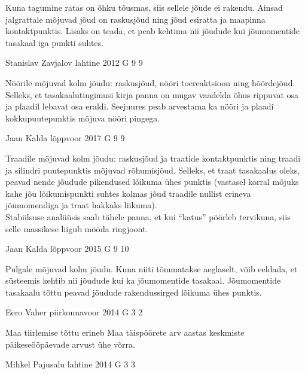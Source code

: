 \documentclass[11pt]{article}
\begin{document}
{{\ifHint
Kuna tagumine ratas on õhku tõusmas, siis sellele jõude ei rakendu. Ainsad jalgrattale mõjuvad jõud on raskusjõud ning jõud esiratta ja maapinna kontaktpunktis. Lisaks on teada, et peab kehtima nii jõudude kui jõumomentide tasakaal iga punkti suhtes.
\fi
}

{Stanislav Zavjalov} %
{lahtine} %
{2012} %
{G 9} %
{9} %
{

\ifHint
Nöörile mõjuvad kolm jõudu: raskusjõud, nööri toereaktsioon ning hõõrdejõud. Selleks, et tasakaalutingimusi kirja panna on mugav vaadelda õhus rippuvat osa ja plaadil lebavat osa eraldi. Seejuures peab arvestama ka nööri ja plaadi kokkupuutepunktis mõjuva nööri pingega.
\fi
}

{Jaan Kalda} %
{lõppvoor} %
{2017} %
{G 9} %
{9} %
{

\ifHint
Traadile mõjuvad kolm jõudu: raskusjõud ja traatide kontaktpunktis ning traadi ja silindri puutepunktis mõjuvad rõhumisjõud. Selleks, et traat tasakaalus oleks, peavad nende jõudude pikendused lõikuma ühes punktis (vastasel korral mõjuks kahe jõu lõikumispunkti suhtes kolmas jõud traadile nullist erineva jõumomendiga ja traat hakkaks liikuma).\\
Stabiilsuse analüüsis saab tähele panna, et kui \enquote{katus} pöörleb tervikuna, siis selle massikese liigub mööda ringjoont.
\fi
}

{Jaan Kalda} %
{lõppvoor} %
{2015} %
{G 9} %
{10} %
{

\ifHint
Pulgale mõjuvad kolm jõudu. Kuna niiti tõmmatakse aeglaselt, võib eeldada, et süsteemis kehtib nii jõudude kui ka jõumomentide tasakaal. Jõumomentide tasakaalu tõttu peavad jõudude rakendussirged lõikuma ühes punktis.
\fi
}

{Eero Vaher} %
{piirkonnavoor} %
{2014} %
{G 3} %
{2} %
{

\ifHint
Maa tiirlemise tõttu erineb Maa täispöörete arv aastas keskmiste päikeseööpäevade arvust ühe võrra.
\fi
}

{Mihkel Pajusalu} %
{lahtine} %
{2014} %
{G 3} %
{3} %
{

}}
\end{document}
